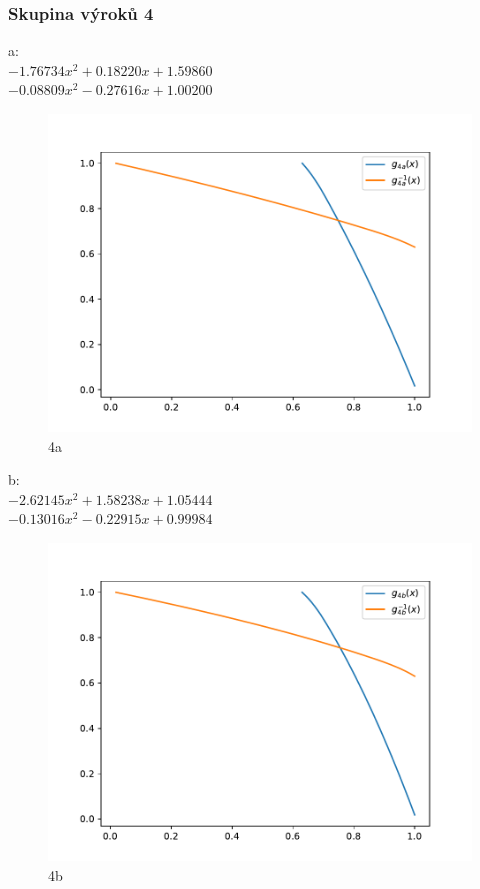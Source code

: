 \subsubsection{Skupina výrok\r u 4}
a:\\
$-1.76734x^2+0.18220x+1.59860$\\
$-0.08809x^2-0.27616x+1.00200$\\
\begin{figure}[H]
    \caption{4a}
        \hspace{-1cm}
        \includegraphics[scale=0.5]{template-fig/p6.pdf}
        \centering
\end{figure}
b:\\
$-2.62145x^2+1.58238x+1.05444$\\
$-0.13016x^2-0.22915x+0.99984$\\
\begin{figure}[H]
    \caption{4b}
        \hspace{-1cm}
        \includegraphics[scale=0.5]{template-fig/p7.pdf}
        \centering
\end{figure}
